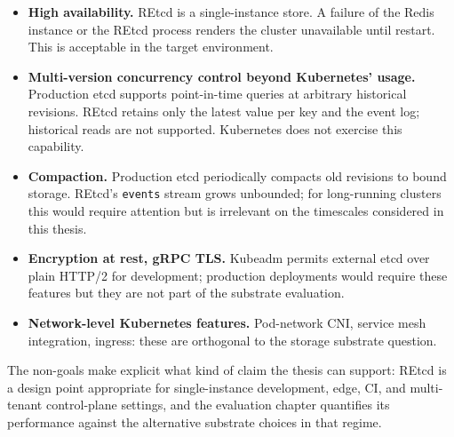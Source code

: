 \begin{itemize}
    \item \textbf{High availability.} REtcd is a single-instance store. A failure of the Redis instance or the REtcd process renders the cluster unavailable until restart. This is acceptable in the target environment.
    \item \textbf{Multi-version concurrency control beyond Kubernetes' usage.} Production etcd supports point-in-time queries at arbitrary historical revisions. REtcd retains only the latest value per key and the event log; historical reads are not supported. Kubernetes does not exercise this capability.
    \item \textbf{Compaction.} Production etcd periodically compacts old revisions to bound storage. REtcd's \texttt{events} stream grows unbounded; for long-running clusters this would require attention but is irrelevant on the timescales considered in this thesis.
    \item \textbf{Encryption at rest, gRPC TLS.} Kubeadm permits external etcd over plain HTTP/2 for development; production deployments would require these features but they are not part of the substrate evaluation.
    \item \textbf{Network-level Kubernetes features.} Pod-network CNI, service mesh integration, ingress: these are orthogonal to the storage substrate question.
\end{itemize}

The non-goals make explicit what kind of claim the thesis can support: REtcd is a design point appropriate for single-instance development, edge, CI, and multi-tenant control-plane settings, and the evaluation chapter quantifies its performance against the alternative substrate choices in that regime.

